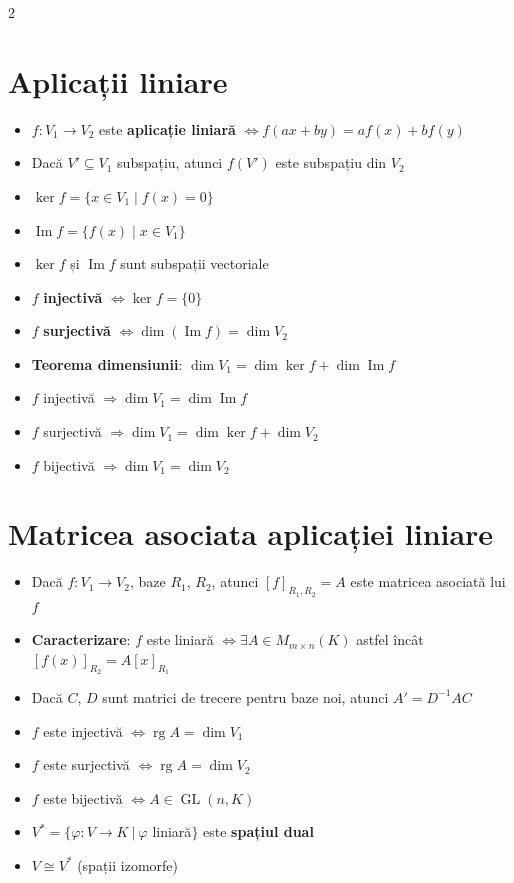 \documentclass[10pt]{extarticle}
\begin{document}
\begin{multicols*}{2}
\begin{itemize}[leftmargin=*]
  \section*{Aplicații liniare}
\begin{itemize}[leftmargin=*]
  \item $f : V_1 \to V_2$ este \textbf{aplicație liniară} $\Leftrightarrow f(ax + by) = af(x) + bf(y)$
  \item Dacă $V' \subseteq V_1$ subspațiu, atunci $f(V')$ este subspațiu din $V_2$
  \item $\ker f = \{x \in V_1 \mid f(x) = 0\}$
  \item $\operatorname{Im} f = \{f(x) \mid x \in V_1\}$
  \item $\ker f$ și $\operatorname{Im} f$ sunt subspații vectoriale
  \item $f$ \textbf{injectivă} $\Leftrightarrow \ker f = \{0\}$
  \item $f$ \textbf{surjectivă} $\Leftrightarrow \dim(\operatorname{Im} f) = \dim V_2$
  \item \textbf{Teorema dimensiunii}: $\dim V_1 = \dim \ker f + \dim \operatorname{Im} f$
  \item $f$ injectivă $\Rightarrow \dim V_1 = \dim \operatorname{Im} f$
  \item $f$ surjectivă $\Rightarrow \dim V_1 = \dim \ker f + \dim V_2$
  \item $f$ bijectivă $\Rightarrow \dim V_1 = \dim V_2$
\end{itemize}

\section*{Matricea asociata aplicației liniare}
\begin{itemize}[leftmargin=*]
  \item Dacă $f : V_1 \to V_2$, baze $R_1$, $R_2$, atunci $[f]_{R_1, R_2} = A$ este matricea asociată lui $f$
  \item \textbf{Caracterizare}: $f$ este liniară $\Leftrightarrow \exists A \in M_{m \times n}(K)$ astfel încât $[f(x)]_{R_2} = A [x]_{R_1}$
  \item Dacă $C$, $D$ sunt matrici de trecere pentru baze noi, atunci $A' = D^{-1} A C$
  \item $f$ este injectivă $\Leftrightarrow \operatorname{rg} A = \dim V_1$
  \item $f$ este surjectivă $\Leftrightarrow \operatorname{rg} A = \dim V_2$
  \item $f$ este bijectivă $\Leftrightarrow A \in \operatorname{GL}(n, K)$
  \item $V^* = \{\varphi : V \to K\ |\ \varphi$ liniară$\}$ este \textbf{spațiul dual}
  \item $V \cong V^*$ (spații izomorfe)
  

\end{itemize}
\end{itemize}
\end{multicols*}
\end{document}
